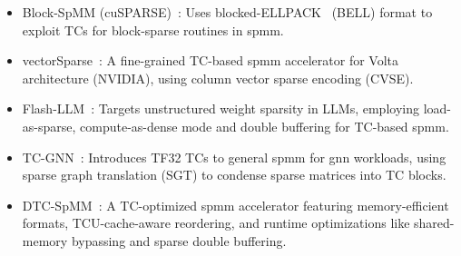 \begin{itemize}
\begin{itemize}
        \item Block-SpMM (cuSPARSE)~\cite{NVIDIA2014_cuSPARSE}: Uses blocked-ELLPACK~\cite{Kincaid1989_ELLPACK} (BELL) format to exploit TCs for block-sparse routines in \acrshort{spmm}.
        \item vectorSparse~\cite{Gale2020_vectorSparse}: A fine-grained TC-based \acrshort{spmm} accelerator for Volta architecture (NVIDIA), using column vector sparse encoding (CVSE).
        \item Flash-LLM~\cite{Xia2023_Flash-LLM}: Targets unstructured weight sparsity in LLMs, employing load-as-sparse, compute-as-dense mode and double buffering for TC-based \acrshort{spmm}.
        \item TC-GNN~\cite{Yuke2023_TC-GNN}: Introduces TF32 TCs to general \acrshort{spmm} for \acrshort{gnn} workloads, using sparse graph translation (SGT) to condense sparse matrices into TC blocks.
        \item DTC-SpMM~\cite{Fan2024_DTC-SpMM}: A TC-optimized \acrshort{spmm} accelerator featuring memory-efficient formats, TCU-cache-aware reordering, and runtime optimizations like shared-memory bypassing and sparse double buffering.
    \end{itemize}
\end{itemize}